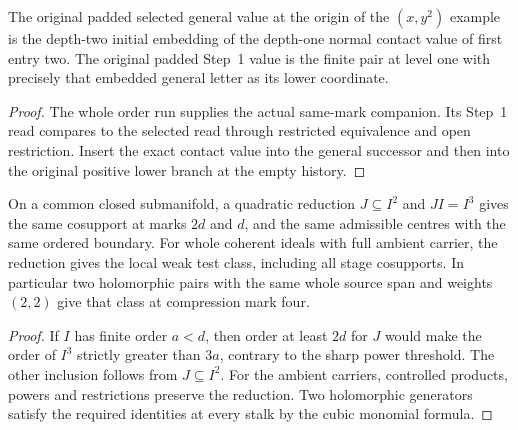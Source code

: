 \begin{theorem}
\label{hir:g1-finite-example-original-general-letter}
\leanok
The original padded selected general value at the origin of the
$(x,y^2)$ example is the depth-two initial embedding of the depth-one
normal contact value of first entry two. The original padded Step~1
value is the finite pair at level one with precisely that embedded
general letter as its lower coordinate.
\end{theorem}
\begin{proof}
The whole order run supplies the actual same-mark companion. Its
Step~1 read compares to the selected read through restricted
equivalence and open restriction. Insert the exact contact value into
the general successor and then into the original positive lower
branch at the empty history.
\end{proof}

\begin{theorem}
\label{hir:g1-two-vertex-quadratic-weak-class}
\leanok
On a common closed submanifold, a quadratic reduction
$J\subseteq I^2$ and $JI=I^3$ gives the same cosupport at marks $2d$
and $d$, and the same admissible centres with the same ordered
boundary. For whole coherent ideals with full ambient carrier,
the reduction gives the local weak test class, including all stage
cosupports. In particular two holomorphic pairs with the same whole
source span and weights $(2,2)$ give that class at compression
mark four.
\end{theorem}
\begin{proof}
If $I$ has finite order $a<d$, then order at least $2d$ for $J$
would make the order of $I^3$ strictly greater than $3a$,
contrary to the sharp power threshold. The other inclusion follows
from $J\subseteq I^2$. For the ambient carriers, controlled products,
powers and restrictions preserve the reduction. Two holomorphic
generators satisfy the required identities at every stalk by the
cubic monomial formula.
\end{proof}

